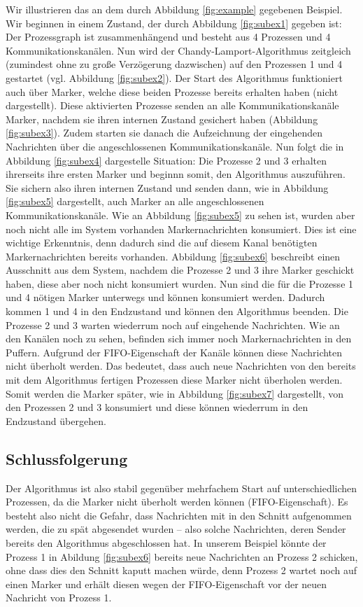 \documentclass[a4paper,
12pt,
BCOR12mm,
]{scrartcl}
\begin{document}
Wir illustrieren das an dem durch Abbildung \ref{fig:example} gegebenen Beispiel. Wir
beginnen in einem Zustand, der durch Abbildung \ref{fig:subex1} gegeben ist: Der
Prozessgraph ist zusammenhängend und besteht aus 4 Prozessen und 4 Kommunikationskanälen.
Nun wird der Chandy-Lamport-Algorithmus zeitgleich (zumindest ohne zu große Verzögerung
dazwischen) auf den Prozessen 1 und 4 gestartet (vgl. Abbildung \ref{fig:subex2}). Der
Start des Algorithmus funktioniert auch über Marker, welche diese beiden Prozesse bereits
erhalten haben (nicht dargestellt). Diese aktivierten Prozesse senden an alle
Kommunikationskanäle Marker, nachdem sie ihren internen Zustand gesichert haben (Abbildung
\ref{fig:subex3}). Zudem starten sie danach die Aufzeichnung der eingehenden Nachrichten
über die angeschlossenen Kommunikationskanäle. Nun folgt die in Abbildung \ref{fig:subex4}
dargestelle Situation: Die Prozesse 2 und 3 erhalten ihrerseits ihre ersten Marker und
beginnn somit, den Algorithmus auszuführen. Sie sichern also ihren internen Zustand und
senden dann, wie in Abbildung \ref{fig:subex5} dargestellt, auch Marker an alle
angeschlossenen Kommunikationskanäle. Wie an Abbildung \ref{fig:subex5} zu sehen ist,
wurden aber noch nicht alle im System vorhanden Markernachrichten konsumiert. Dies ist
eine wichtige Erkenntnis, denn dadurch sind die auf diesem Kanal benötigten
Markernachrichten bereits vorhanden. Abbildung \ref{fig:subex6} beschreibt einen
Ausschnitt aus dem System, nachdem die Prozesse 2 und 3 ihre Marker geschickt haben, diese
aber noch nicht konsumiert wurden. Nun sind die für die Prozesse 1 und 4 nötigen Marker
unterwegs und können konsumiert werden. Dadurch kommen 1 und 4 in den Endzustand und
können den Algorithmus beenden. Die Prozesse 2 und 3 warten wiederrum noch auf eingehende
Nachrichten. Wie an den Kanälen noch zu sehen, befinden sich immer noch Markernachrichten
in den Puffern. Aufgrund der FIFO-Eigenschaft der Kanäle können diese Nachrichten nicht
überholt werden. Das bedeutet, dass auch neue Nachrichten von den bereits mit dem
Algorithmus fertigen Prozessen diese Marker nicht überholen werden. Somit werden die
Marker später, wie in Abbildung \ref{fig:subex7} dargestellt,
von den Prozessen 2 und 3 konsumiert und diese können wiederrum in den Endzustand
übergehen.

\subsection*{Schlussfolgerung}
Der Algorithmus ist also stabil gegenüber mehrfachem Start auf unterschiedlichen
Prozessen, da die Marker nicht überholt werden können (FIFO-Eigenschaft). Es besteht also
nicht die Gefahr, dass Nachrichten mit in den Schnitt aufgenommen werden, die zu spät
abgesendet wurden -- also solche Nachrichten, deren Sender bereits den Algorithmus
abgeschlossen hat. In unserem Beispiel könnte der Prozess 1 in Abildung \ref{fig:subex6} bereits neue Nachrichten an
Prozess 2 schicken, ohne dass dies den Schnitt kaputt machen würde, denn Prozess 2 wartet
noch auf einen Marker und erhält diesen wegen der FIFO-Eigenschaft vor der neuen Nachricht
von Prozess 1.
\end{document}
